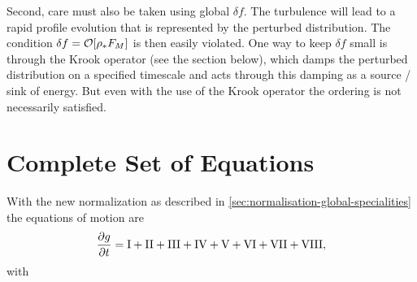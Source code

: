 Second, care must also be taken using global $\delta f$. The turbulence will lead to a 
rapid profile evolution that is represented by the perturbed distribution. The condition 
$\delta f = {\cal O}[ \rho_* F_M ]$ is then easily violated. 
One way to keep $\delta f$ small is through the Krook operator (see the section below), which damps the 
perturbed distribution on a specified timescale and acts through this damping as a source / sink of energy. 
But even with the use of the Krook operator the ordering is not necessarily satisfied. 

\section{Complete Set of Equations}
\label{sec:global-compl-set-equat}


With the new normalization as described in \ref{sec:normalisation-global-specialities} the equations of motion are
\begin{equation}
\label{eqs:global-complete-set}
\frac{\partial g}{\partial t} = {\rm I} + {\rm II} + {\rm III} + {\rm IV} + {\rm V} + {\rm VI}+ {\rm VII}+ {\rm VIII},
\end{equation}
with 
\pagebreak

